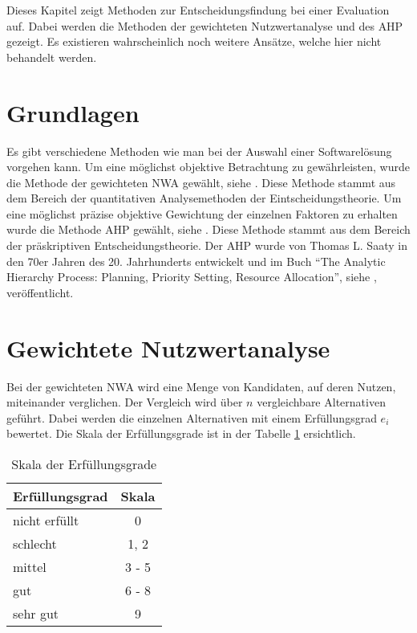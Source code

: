   Dieses Kapitel zeigt Methoden zur Entscheidungsfindung bei einer Evaluation
  auf. Dabei werden die Methoden der gewichteten Nutzwertanalyse und des
  \ac{AHP} gezeigt. Es existieren wahrscheinlich noch weitere Ansätze, welche
  hier nicht behandelt werden.
  
  \section{Grundlagen}
  
  Es gibt verschiedene Methoden wie man bei der Auswahl einer Softwarelösung
  vorgehen kann. Um eine möglichst objektive Betrachtung zu gewährleisten, wurde
  die Methode der gewichteten \ac{NWA} gewählt, siehe \cite{Nutzwertanalyse}.
  Diese Methode stammt aus dem Bereich der quantitativen Analysemethoden der
  Eintscheidungstheorie. Um eine möglichst präzise objektive Gewichtung der
  einzelnen Faktoren zu erhalten wurde die Methode \ac{AHP} gewählt, siehe
  \cite{AnalyticHierarchyProcess}. Diese Methode stammt aus dem Bereich der
  präskriptiven Entscheidungstheorie. Der \ac{AHP} wurde von Thomas L. Saaty in
  den 70er Jahren des 20. Jahrhunderts entwickelt und im Buch ``The Analytic
  Hierarchy Process: Planning, Priority Setting, Resource
  Allocation'', siehe \cite{AnalyticHierarchyProcessBook}, veröffentlicht.
  
  \section{Gewichtete Nutzwertanalyse}
  
  Bei der gewichteten \ac{NWA} wird eine Menge von Kandidaten, auf deren
  Nutzen, miteinander verglichen. Der Vergleich wird über \(n\) vergleichbare
  Alternativen geführt. Dabei werden die einzelnen Alternativen mit einem
  Erfüllungsgrad \(e_i\) bewertet. Die Skala der Erfüllungsgrade ist in der
  Tabelle \ref{tab:erfuellungsgrade} ersichtlich.
  \newline
  
  \begin{table}[ht]
    \begin{center}
      \begin{tabular}{lc}
        \toprule
        Erfüllungsgrad & Skala\\
        \midrule
        nicht erfüllt & 0\\
        schlecht & 1, 2\\
        mittel & 3 - 5\\
        gut & 6 - 8\\
        sehr gut & 9\\
        \bottomrule
      \end{tabular}
      \caption{Skala der Erfüllungsgrade}
      \label{tab:erfuellungsgrade}
    \end{center}
  \end{table}
  

